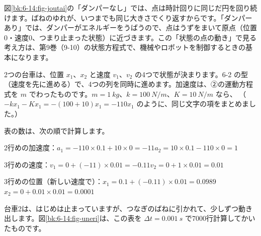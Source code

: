 図\ref{bk:6-14:fig-joutai}の「ダンパーなし」では、点は時計回りに同じだ円を回り続けます。ばねのゆれが、いつまでも同じ大きさでくり返すからです。「ダンパーあり」では、ダンパーがエネルギーをうばうので、点はうずをまいて原点（位置0・速度0、つまり止まった状態）に近づきます。この「状態の点の動き」で見る考え方は、第9巻（9-10）の状態方程式で、機械やロボットを制御するときの基本になります。

2つの台車は、位置 $x_1$、$x_2$ と速度 $v_1$、$v_2$ の4つで状態が決まります。6-2 の型（速度を先に進める）で、4つの列を同時に進めます。加速度は、②の運動方程式を $m$ でわったものです。$m=\qty{1}{kg}$、$k=\qty{100}{N/m}$、$K=\qty{10}{N/m}$ なら、
（$-kx_1-Kx_1=-(100+10)x_1=-110x_1$ のように、同じ文字の項をまとめました。）

\begin{bkcenter}
\end{bkcenter}
表の数は、次の順で計算します。
\begin{enumerate}[label={\bkcircled[\bkTT]{\arabic*}}, leftmargin=2.4\zw, itemsep=1pt, topsep=2pt]
\item 2行めの加速度：$a_1=-110\times0.1+10\times0=-11$\newline $a_2=10\times0.1-110\times0=1$
\item 3行めの速度：$v_1=0+(-11)\times0.01=-0.11$\newline $v_2=0+1\times0.01=0.01$
\item 3行めの位置（新しい速度で）：$x_1=0.1+(-0.11)\times0.01=0.0989$\newline $x_2=0+0.01\times0.01=0.0001$
\end{enumerate}
台車2は、はじめは止まっていますが、つなぎのばねに引かれて、少しずつ動き出します。図\ref{bk:6-14:fig-uneri}は、この表を $\Delta t=\qty{0.001}{s}$ で7000行計算してかいたものです。


